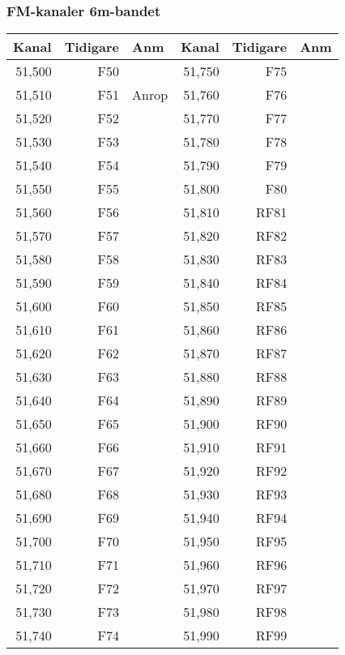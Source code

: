 \clearpage
\subsubsection{FM-kanaler 6m-bandet}

\begin{longtable}{rrl|rrl}
\textbf{Kanal} & \textbf{Tidigare} & \textbf{Anm}   
&  \textbf{Kanal} & \textbf{Tidigare} & \textbf{Anm} \\ \hline
	51,500 &      F50 &       & 51,750 &      F75 &  \\
	51,510 &      F51 & Anrop & 51,760 &      F76 &  \\
	51,520 &      F52 &       & 51,770 &      F77 &  \\
	51,530 &      F53 &       & 51,780 &      F78 &  \\
	51,540 &      F54 &       & 51,790 &      F79 &  \\
	51,550 &      F55 &       & 51,800 &      F80 &  \\
	51,560 &      F56 &       & 51,810 &     RF81 &  \\
	51,570 &      F57 &       & 51,820 &     RF82 &  \\
	51,580 &      F58 &       & 51,830 &     RF83 &  \\
	51,590 &      F59 &       & 51,840 &     RF84 &  \\
	51,600 &      F60 &       & 51,850 &     RF85 &  \\
	51,610 &      F61 &       & 51,860 &     RF86 &  \\
	51,620 &      F62 &       & 51,870 &     RF87 &  \\
	51,630 &      F63 &       & 51,880 &     RF88 &  \\
	51,640 &      F64 &       & 51,890 &     RF89 &  \\
	51,650 &      F65 &       & 51,900 &     RF90 &  \\
	51,660 &      F66 &       & 51,910 &     RF91 &  \\
	51,670 &      F67 &       & 51,920 &     RF92 &  \\
	51,680 &      F68 &       & 51,930 &     RF93 &  \\
	51,690 &      F69 &       & 51,940 &     RF94 &  \\
	51,700 &      F70 &       & 51,950 &     RF95 &  \\
	51,710 &      F71 &       & 51,960 &     RF96 &  \\
	51,720 &      F72 &       & 51,970 &     RF97 &  \\
	51,730 &      F73 &       & 51,980 &     RF98 &  \\
	51,740 &      F74 &       & 51,990 &     RF99 &
\end{longtable}

